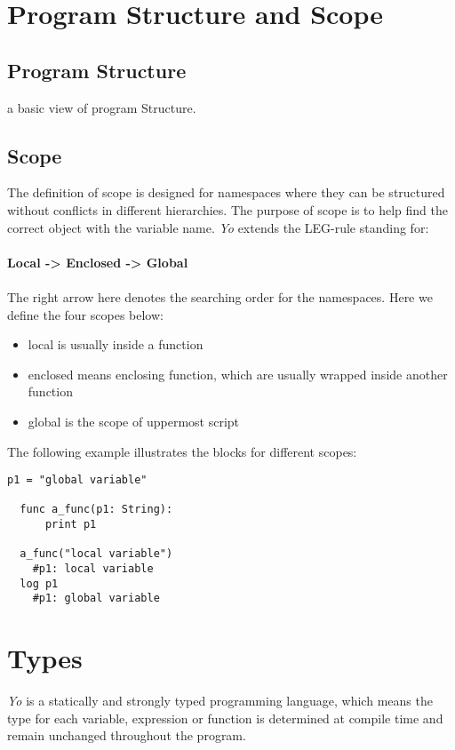 \documentclass[12pt]{article}
\begin{document}
\section{Program Structure and Scope} %

\subsection{Program Structure} %
a basic view of program Structure.\\
\subsection{Scope} %
The definition of scope is designed for namespaces where they can be structured without conflicts in different hierarchies. The purpose of scope is to help find the correct object with the variable name. \textit{Yo} extends the LEG-rule standing for: \\ \\
\textbf{Local -> Enclosed -> Global} \\ \\
The right arrow here denotes the searching order for the namespaces. Here we define the four scopes below:
\begin{itemize}
  \item local is usually inside a function
    \item enclosed means enclosing function, which are usually wrapped inside another function
    \item global is the scope of uppermost script
\end{itemize}
The following example illustrates the  blocks for different scopes:

\begin{lstlisting}[caption=Scope]
  p1 = "global variable"
 
  func a_func(p1: String):
      print p1
 
  a_func("local variable")
    #p1: local variable 
  log p1
    #p1: global variable
\end{lstlisting}

\section{Types}
\textit{Yo} is a statically and strongly typed programming language, which means the type for each variable, expression or function is determined at compile time and remain unchanged throughout the program.
\end{document}
